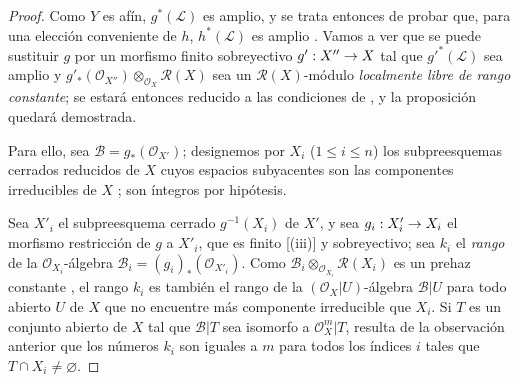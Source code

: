 \documentclass[oneside,10pt]{amsart}
\makeatletter
\renewcommand{\leq}{\leqslant}
\newcommand{\ega@arrow}[2]{\mathchoice{#1}{#2}{#2}{#2}}
\renewcommand{\to}{\ega@arrow{\longrightarrow}{\rightarrow}}
\newcommand{\oldpage}[2][]{\marginnote{\normalfont\footnotesize\textbf{#1}~|~#2}\ignorespaces}
\makeatother
\begin{document}
\begin{proof}
Como $Y$ es afín, $g^*(\mathcal{L})$ es amplio, y se trata entonces de probar que, para una elección conveniente de $h$, $h^*(\mathcal{L})$ es amplio .
Vamos a ver que se puede sustituir $g$ por un morfismo finito sobreyectivo $g':X''\to X$ tal que ${g'}^*(\mathcal{L})$ sea amplio y
$g'_*(\mathcal{O}_{X''})\otimes_{\mathcal{O}_X}\mathcal{R}(X)$
sea un $\mathcal{R}(X)$-módulo \emph{localmente libre de rango constante};
se estará entonces reducido a las condiciones de , y la proposición quedará demostrada.

Para ello, sea $\mathcal{B}=g_*(\mathcal{O}_{X'})$;
designemos por $X_i$ ($1\leq i\leq n$) los subpreesquemas cerrados reducidos de $X$ cuyos espacios subyacentes son las componentes irreducibles de $X$ ;
son íntegros por hipótesis.

Sea $X'_i$ el subpreesquema cerrado
\oldpage[II]{135}
 $g^{-1}(X_i)$ de $X'$, y sea $g_i:X'_i\to X_i$ el morfismo restricción de $g$ a $X'_i$, que es finito [(iii)] y sobreyectivo;
sea $k_i$ el \emph{rango} de la $\mathcal{O}_{X_i}$-álgebra
$\mathcal{B}_i=(g_i)_*(\mathcal{O}_{X'_i})$.
Como $\mathcal{B}_i\otimes_{\mathcal{O}_{X_i}}\mathcal{R}(X_i)$ es un prehaz constante , el rango $k_i$ es también el rango de la $(\mathcal{O}_X|U)$-álgebra $\mathcal{B}|U$ para todo abierto $U$ de $X$ que no encuentre más componente irreducible que $X_i$.
Si $T$ es un conjunto abierto de $X$ tal que $\mathcal{B}|T$ sea isomorfo a $\mathcal{O}_X^m|T$, resulta de la observación anterior que los números $k_i$ son iguales a $m$ para todos los índices $i$ tales que $T\cap X_i\neq\varnothing$.


\end{proof}
\end{document}
